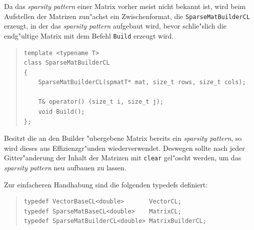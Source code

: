 \documentclass[11pt,a4paper]{article}
\newenvironment{Code}{\begin{quote}\scriptsize}{\end{quote}}
\begin{document}
Da das \emph{sparsity pattern} einer Matrix vorher meist nicht bekannt ist, wird
beim Aufstellen der Matrizen zun"achst ein Zwischenformat, die
\verb|SparseMatBuilderCL| erzeugt, in der das \emph{sparsity pattern} aufgebaut
wird, bevor schlie"slich die endg"ultige Matrix mit dem Befehl \verb|Build|
erzeugt wird. 
\begin{Code}
\begin{verbatim}
template <typename T>
class SparseMatBuilderCL
{
    SparseMatBuilderCL(spmatT* mat, size_t rows, size_t cols);

    T& operator() (size_t i, size_t j);
    void Build();
};
\end{verbatim}
\end{Code}
Besitzt die an den Builder "ubergebene Matrix bereits ein \emph{sparsity
pattern}, so wird dieses aus Effizienzgr"unden wiederverwendet. Deswegen sollte
nach jeder Gitter"anderung der Inhalt der Matrizen mit \verb|clear| gel"oscht
werden, um das \emph{sparsity pattern} neu aufbauen zu lassen.

Zur einfacheren Handhabung sind die folgenden typedefs definiert:
\begin{Code}
\begin{verbatim}
typedef VectorBaseCL<double>       VectorCL;
typedef SparseMatBaseCL<double>    MatrixCL;
typedef SparseMatBuilderCL<double> MatrixBuilderCL;
\end{verbatim}
\end{Code}
\end{document}
